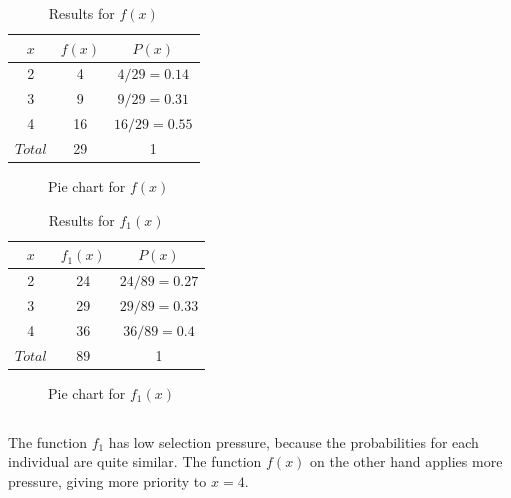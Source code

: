 \documentclass{scrartcl}
\begin{document}
\begin{table}[h!]
\centering
\begin{tabular}{| c | c | c |}
\hline
$x$ & $f(x)$ & $P(x)$ \\
\hline
2 & 4 & $4/29 = 0.14$ \\
\hline
3 & 9 & $9/29 = 0.31$ \\
\hline
4 & 16 & $16/29 = 0.55$ \\
\hline
$Total$ & 29 & 1 \\
\hline
\end{tabular}
\caption{Results for $f(x)$}
\label{table:table2_1_1}
\end{table}

\begin{figure}[h!]
\centering

\caption{Pie chart for $f(x)$}
\label{fig:pie2_1_1}
\end{figure}

\begin{table}[h!]
\centering
\begin{tabular}{| c | c | c |}
 \hline
 $x$ & $f_1(x)$ & $P(x)$ \\
 \hline
 2 & 24 & $24/89 = 0.27$ \\
 \hline
 3 & 29 & $29/89 = 0.33$ \\
 \hline
 4 & 36 & $36/89 = 0.4$ \\
 \hline
 $Total$ & 89 & 1 \\
\hline
\end{tabular}
\caption{Results for $f_1(x)$}
\label{table:table2_1_2}
\end{table}

\begin{figure}[h!]
    \centering
    \caption{Pie chart for $f_1(x)$}
    \label{fig:pie2_1_2}
\end{figure}

\subsection{}
The function $f_1$ has low selection pressure, because the probabilities for each individual are quite similar. The function $f(x)$ on the other hand applies more pressure, giving more priority to $x=4$.
\end{document}
